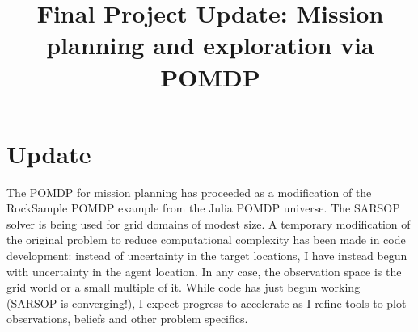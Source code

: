 \documentclass[twoside,11pt]{article}
\begin{document}
\title{Final Project Update: Mission planning and exploration via POMDP}


\maketitle

\section*{Update}

The POMDP for mission planning has proceeded as a modification of the RockSample POMDP example from the Julia POMDP universe. The SARSOP solver is being used for grid domains of modest size. A temporary modification of the original problem to reduce computational complexity has been made in code development: instead of uncertainty in the target locations, I have instead begun with uncertainty in the agent location. In any case, the observation space is the grid world or a small multiple of it. While code has just begun working (SARSOP is converging!), I expect progress to accelerate as I refine tools to plot observations, beliefs and other problem specifics.

%
\end{document}
